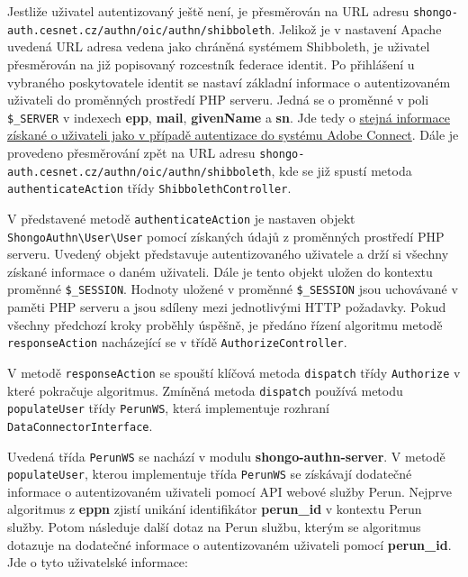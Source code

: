 \documentclass[
  printed, %
  twoside, %
  table,   %
  nolof,     %
  nolot,     %
]{fithesis3}
\begin{document}
Jestliže uživatel autentizovaný ještě není, je přesměrován na URL adresu \texttt{shongo-auth.cesnet.cz/authn/oic/authn/shibboleth}. Jelikož je v nastavení Apache uvedená URL adresa vedena jako chráněná systémem Shibboleth, je uživatel přesměrován na již popisovaný rozcestník federace identit. Po přihlášení u vybraného poskytovatele identit se nastaví základní informace o autentizovaném uživateli do proměnných prostředí PHP serveru. Jedná se o proměnné v poli \texttt{\$\_SERVER} v indexech \textbf{epp}, \textbf{mail}, \textbf{givenName} a \textbf{sn}. Jde tedy o \hyperref[item:adobe-connect]{stejná informace získané o uživateli jako  v případě autentizace do systému Adobe Connect}. Dále je provedeno přesměrování zpět na URL adresu \texttt{shongo-auth.cesnet.cz/authn/oic/authn/shibboleth}, kde se již spustí metoda \texttt{authenticateAction} třídy \texttt{ShibbolethController}. \par

V představené metodě \texttt{authenticateAction} je nastaven objekt \texttt{ShongoAuthn\textbackslash User\textbackslash User} pomocí získaných údajů z proměnných prostředí PHP serveru. Uvedený objekt představuje autentizovaného uživatele a drží si všechny získané informace o daném uživateli. Dále je tento objekt uložen do kontextu proměnné \texttt{\$\_SESSION}. Hodnoty uložené v proměnné \texttt{\$\_SESSION} jsou uchovávané v paměti PHP serveru a jsou sdíleny mezi jednotlivými HTTP požadavky. Pokud všechny předchozí kroky proběhly úspěšně, je předáno řízení algoritmu metodě \texttt{responseAction} nacházející se v třídě \texttt{AuthorizeController}. \par

\label{sec:responseAction}
V metodě \texttt{responseAction} se spouští klíčová metoda \texttt{dispatch} třídy \texttt{Authorize} v které pokračuje algoritmus. Zmíněná metoda \texttt{dispatch} používá metodu \texttt{populateUser} třídy \texttt{PerunWS}, která implementuje rozhraní \texttt{DataConnectorInterface}. \par

Uvedená třída \texttt{PerunWS} se nachází v modulu \textbf{shongo-authn-server}. V metodě \texttt{populateUser}, kterou implementuje třída \texttt{PerunWS} se získávají dodatečné informace o autentizovaném uživateli pomocí API webové služby Perun. Nejprve algoritmus z \textbf{eppn} zjistí unikání identifikátor \textbf{perun\_id} v kontextu Perun služby. Potom následuje další dotaz na Perun službu, kterým se algoritmus dotazuje na dodatečné informace o autentizovaném uživateli pomocí \textbf{perun\_id}. Jde o tyto uživatelské informace:
\end{document}
